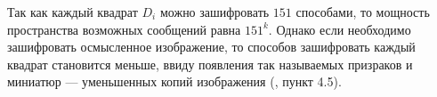 Так как каждый квадрат $D_{i}$ можно зашифровать $151$ способами, то мощность пространства возможных сообщений равна $151^{k}$. Однако если необходимо зашифровать осмысленное изображение, то способов зашифровать каждый квадрат становится меньше, ввиду появления так называемых призраков и миниатюр --- уменьшенных копий изображения (\autocite{cat}, пункт 4.5).
